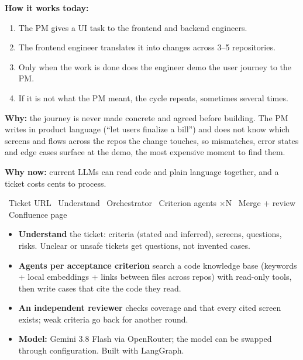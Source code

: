 \documentclass[10pt,a4paper]{article}
\newcommand{\prdsec}[2]{\par\vspace{7pt}{\large\bfseries{\color{accent}#1}\hspace{0.55em}#2}\par\vspace{3pt}}
\begin{document}
\noindent
\begin{minipage}[t]{0.485\linewidth}
\prdsec{2}{Problem}
\textbf{How it works today:}
\begin{enumerate}
  \item The PM gives a UI task to the frontend and backend engineers.
  \item The frontend engineer translates it into changes across 3--5 repositories.
  \item Only when the work is done does the engineer demo the user journey to the PM.
  \item If it is not what the PM meant, the cycle repeats, sometimes several times.
\end{enumerate}
\vspace{3pt}
\textbf{Why:} the journey is never made concrete and agreed before building. The PM writes in product
language (``let users finalize a bill'') and does not know which screens and flows across the repos
the change touches, so mismatches, error states and edge cases surface at the demo, the most
expensive moment to find them.

\textbf{Why now:} current LLMs can read code and plain language together, and a ticket costs cents
to process.
\end{minipage}\hfill
\begin{minipage}[t]{0.485\linewidth}
\prdsec{3}{Approach}
\begin{tcbitemize}[raster columns=3,raster equal height,raster column skip=4pt,raster row skip=4pt,
  colback=white,colframe=rulegrey,boxrule=0.5pt,arc=1pt,left=3pt,right=3pt,top=2pt,bottom=2pt,
  fontupper=\footnotesize\ttfamily]
\ Ticket URL
\ Understand
\ Orchestrator
\ Criterion agents $\times$N
\ Merge + review
\ Confluence page
\end{tcbitemize}
\vspace{2pt}
\begin{itemize}
  \item \textbf{Understand} the ticket: criteria (stated and inferred), screens, questions, risks.
        Unclear or unsafe tickets get questions, not invented cases.
  \item \textbf{Agents per acceptance criterion} search a code knowledge base (keywords + local
        embeddings + links between files across repos) with read-only tools, then write cases that
        cite the code they read.
  \item \textbf{An independent reviewer} checks coverage and that every cited screen exists; weak
        criteria go back for another round.
  \item \textbf{Model:} Gemini 3.8 Flash via OpenRouter; the model can be swapped through
        configuration. Built with LangGraph.
\end{itemize}
\end{minipage}
\end{document}
